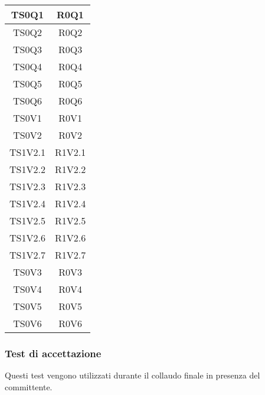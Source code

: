 \begin{longtable}{|c|c|}
    	TS0Q1&R0Q1 \\ \hline
    	TS0Q2&R0Q2 \\ \hline
    	TS0Q3&R0Q3 \\ \hline
    	TS0Q4&R0Q4 \\ \hline
    	TS0Q5&R0Q5 \\ \hline
    	TS0Q6&R0Q6 \\ \hline
    	
    	TS0V1&R0V1 \\ \hline
    	TS0V2&R0V2 \\ \hline
    	TS1V2.1&R1V2.1 \\ \hline
    	TS1V2.2&R1V2.2 \\ \hline
    	TS1V2.3&R1V2.3 \\ \hline
    	TS1V2.4&R1V2.4 \\ \hline
    	TS1V2.5&R1V2.5 \\ \hline
    	TS1V2.6&R1V2.6 \\ \hline
    	TS1V2.7&R1V2.7 \\ \hline
    	TS0V3&R0V3 \\ \hline
    	TS0V4&R0V4 \\ \hline
    	TS0V5&R0V5 \\ \hline
    	TS0V6&R0V6 \\ \hline
    \end{longtable}
	
		
	\subsubsection{Test di accettazione}
	Questi test vengono utilizzati durante il collaudo finale in presenza del committente.
	
